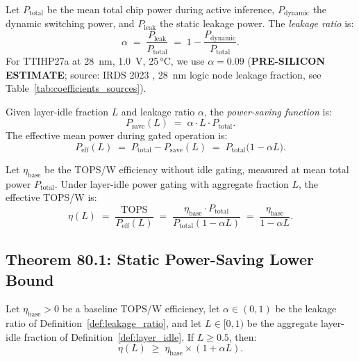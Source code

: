 \begin{definition}
\label{def:leakage_ratio}
Let \(P_{\mathrm{total}}\) be the mean total chip power during active
inference, \(P_{\mathrm{dynamic}}\) the dynamic switching power, and
\(P_{\mathrm{leak}}\) the static leakage power.  The \emph{leakage ratio}
is:
\[
  \alpha \;=\; \frac{P_{\mathrm{leak}}}{P_{\mathrm{total}}}
  \;=\; 1 - \frac{P_{\mathrm{dynamic}}}{P_{\mathrm{total}}}.
\]
For TTIHP27a at 28~nm, 1.0~V, 25\,°C, we use \(\alpha = 0.09\)
(\textbf{PRE-SILICON ESTIMATE}; source: IRDS 2023 \cite{irds2023}, 28~nm
logic node leakage fraction, see Table~\ref{tab:coefficients_sources}).
\end{definition}

\begin{definition}
\label{def:power_saving}
Given layer-idle fraction \(L\) and leakage ratio \(\alpha\), the
\emph{power-saving function} is:
\[
  P_{\mathrm{save}}(L) \;=\; \alpha \cdot L \cdot P_{\mathrm{total}}.
\]
The effective mean power during gated operation is:
\[
  P_{\mathrm{eff}}(L) \;=\; P_{\mathrm{total}} - P_{\mathrm{save}}(L)
  \;=\; P_{\mathrm{total}} \bigl(1 - \alpha L\bigr).
\]
\end{definition}

\begin{definition}
\label{def:effective_tops_w}
Let \(\eta_{\mathrm{base}}\) be the TOPS/W efficiency without idle gating,
measured at mean total power \(P_{\mathrm{total}}\).  Under layer-idle
power gating with aggregate fraction \(L\), the effective TOPS/W is:
\[
  \eta(L) \;=\; \frac{\mathrm{TOPS}}{P_{\mathrm{eff}}(L)}
  \;=\; \frac{\eta_{\mathrm{base}} \cdot P_{\mathrm{total}}}{P_{\mathrm{total}}(1 - \alpha L)}
  \;=\; \frac{\eta_{\mathrm{base}}}{1 - \alpha L}.
\]
\end{definition}

\subsection{Theorem 80.1: Static Power-Saving Lower Bound}

\begin{theorem}
\label{thm:static_power_saving_lb}
Let \(\eta_{\mathrm{base}} > 0\) be a baseline TOPS/W efficiency, let
\(\alpha \in (0, 1)\) be the leakage ratio of
Definition~\ref{def:leakage_ratio}, and let \(L \in [0, 1)\) be the
aggregate layer-idle fraction of Definition~\ref{def:layer_idle}.  If
\(L \geq 0.5\), then:
\[
  \eta(L) \;\geq\; \eta_{\mathrm{base}} \times \left(1 + \alpha L\right).
\]
\end{theorem}


